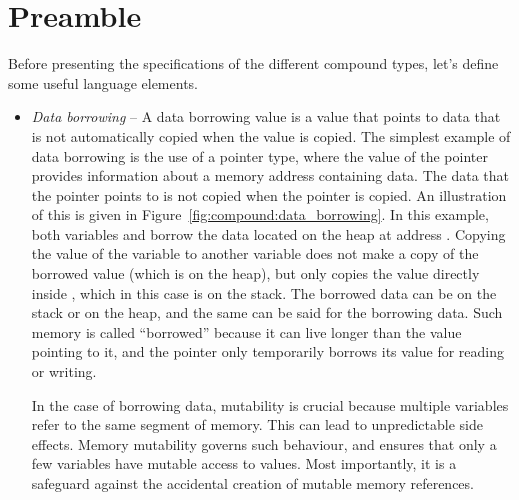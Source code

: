 \section{Preamble}%
\label{sec:compound:preamble_compound_types}

Before presenting the specifications of the different compound types, let's
define some useful language elements.

\begin{itemize}
\item \textit{Data borrowing} -- A data borrowing value is a value that points
  to data that is not automatically copied when the value is copied. The
  simplest example of data borrowing is the use of a pointer type, where the
  value of the pointer provides information about a memory address containing
  data. The data that the pointer points to is not copied when the pointer is
  copied. An illustration of this is given in Figure~\ref{fig:compound:data_borrowing}.
  In this example, both variables  and  borrow the data
  located on the heap at address . Copying the value of the
  variable  to another variable does not make a copy of the borrowed
  value (which is on the heap), but only copies the value directly inside
  , which in this case is on the stack. The borrowed data can be on
  the stack or on the heap, and the same can be said for the borrowing data.
  Such memory is called ``borrowed'' because it can live longer than the value
  pointing to it, and the pointer only temporarily borrows its value for reading
  or writing.

  In the case of borrowing data, mutability is crucial because multiple variables
  refer to the same segment of memory. This can lead to unpredictable side
  effects. Memory mutability governs such behaviour, and ensures that
  only a few variables have mutable access to values. Most importantly, it is a
  safeguard against the accidental creation of mutable memory references.


\end{itemize}



